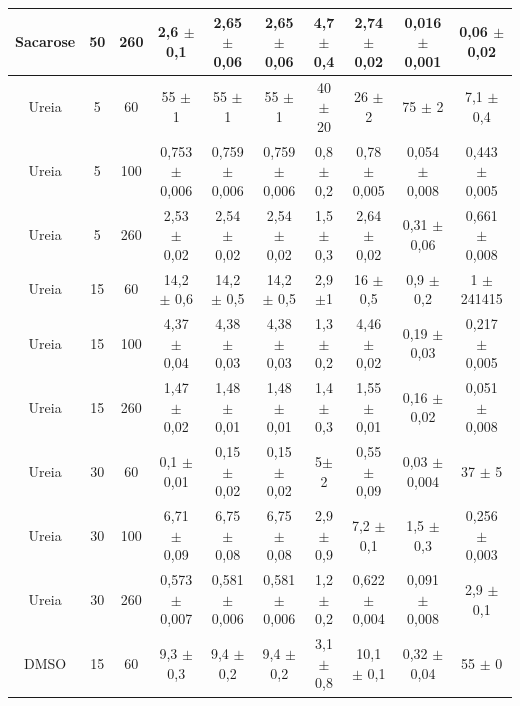 \begin{table}[h]
\begin{adjustbox}{angle=90}
{\begin{tabular}{c c c | c c c c c c c}
				Sacarose  & 50         & 260      & 2,6     \(\pm\) 0,1    & 2,65     \(\pm\) 0,06   & 2,65      \(\pm\) 0,06    & 4,7\(\pm\)0,4 & 2,74        \(\pm\) 0,02   & 0,016       \(\pm\) 0,001  & 0,06  \(\pm\)  0,02  \\ \midrule
				Ureia   & 5          & 60       & 55      \(\pm\) 1      & 55       \(\pm\) 1      & 55        \(\pm\) 1       & 40\(\pm\)20   & 26          \(\pm\) 2      & 75          \(\pm\) 2        & 7,1   \(\pm\)   0,4  \\
				Ureia   & 5          & 100      & 0,753   \(\pm\) 0,006  & 0,759    \(\pm\) 0,006  & 0,759     \(\pm\) 0,006   & 0,8\(\pm\)0,2 & 0,78        \(\pm\) 0,005  & 0,054       \(\pm\) 0,008    & 0,443 \(\pm\)  0,005  \\
				Ureia   & 5          & 260      & 2,53    \(\pm\) 0,02   & 2,54     \(\pm\) 0,02   & 2,54      \(\pm\) 0,02    & 1,5\(\pm\)0,3 & 2,64        \(\pm\) 0,02   & 0,31        \(\pm\) 0,06     & 0,661 \(\pm\)  0,008  \\
				Ureia   & 15         & 60       & 14,2    \(\pm\) 0,6    & 14,2     \(\pm\) 0,5    & 14,2      \(\pm\) 0,5     & 2,9\(\pm\)1   & 16          \(\pm\) 0,5    & 0,9         \(\pm\) 0,2      & 1     \(\pm\)   241415  \\
				Ureia   & 15         & 100      & 4,37    \(\pm\) 0,04   & 4,38     \(\pm\) 0,03   & 4,38      \(\pm\) 0,03    & 1,3\(\pm\)0,2 & 4,46        \(\pm\) 0,02   & 0,19        \(\pm\) 0,03     & 0,217 \(\pm\)  0,005  \\
				Ureia   & 15         & 260      & 1,47    \(\pm\) 0,02   & 1,48     \(\pm\) 0,01   & 1,48      \(\pm\) 0,01    & 1,4\(\pm\)0,3 & 1,55        \(\pm\) 0,01   & 0,16        \(\pm\) 0,02     & 0,051 \(\pm\)  0,008  \\
				Ureia   & 30         & 60       & 0,1     \(\pm\) 0,01   & 0,15     \(\pm\) 0,02   & 0,15      \(\pm\) 0,02    & 5\(\pm\)2     & 0,55        \(\pm\) 0,09   & 0,03        \(\pm\) 0,004    & 37    \(\pm\)      5  \\
				Ureia   & 30         & 100      & 6,71    \(\pm\) 0,09   & 6,75     \(\pm\) 0,08   & 6,75      \(\pm\) 0,08    & 2,9\(\pm\)0,9 & 7,2         \(\pm\) 0,1    & 1,5         \(\pm\) 0,3      & 0,256 \(\pm\)  0,003  \\
				Ureia   & 30         & 260      & 0,573   \(\pm\) 0,007  & 0,581    \(\pm\) 0,006  & 0,581     \(\pm\) 0,006   & 1,2\(\pm\)0,2 & 0,622       \(\pm\) 0,004  & 0,091       \(\pm\) 0,008    & 2,9   \(\pm\)   0,1  \\ \midrule
				DMSO    & 15         & 60       & 9,3     \(\pm\) 0,3    & 9,4      \(\pm\) 0,2    & 9,4       \(\pm\) 0,2     & 3,1\(\pm\)0,8 & 10,1        \(\pm\) 0,1    & 0,32        \(\pm\) 0,04     & 55    \(\pm\)   0  \\

\end{tabular}}
\end{adjustbox}
\end{table}
